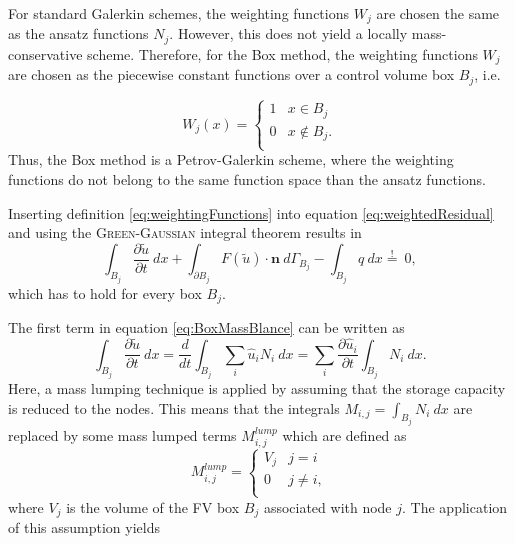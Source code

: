 For standard Galerkin schemes, the weighting functions $W_j$ are chosen the same as the ansatz functions $N_j$. However, this does not yield a locally mass-conservative scheme. 
Therefore, for the Box method, the weighting functions $W_j$ are chosen as 
the piecewise constant functions over a
control volume box $B_j$, i.e.

\begin{equation}
	W_j(x) = \begin{cases}
	          1 &x \in B_j \\
		  0 &x \notin B_j.\\
	         \end{cases}
\label{eq:weightingFunctions}	         
\end{equation}
Thus, the Box method is a Petrov-Galerkin scheme, where the weighting functions do not belong to the same function space than the ansatz functions.

Inserting definition \eqref{eq:weightingFunctions} into equation \eqref{eq:weightedResidual} and using the \textsc{Green-Gaussian} integral theorem results in
\begin{equation}
	\int_{B_j} \frac{\partial \tilde u}{\partial t} \: dx + \int_{\partial B_j}  F(\tilde u) \cdot \mathbf n \: d\varGamma_{B_j} - \int_{B_j} q \: dx  \overset {!}{=} \: 0, 	
\label{eq:BoxMassBlance}	
\end{equation}
which has to hold for every box $B_j$. 

The first term in equation \eqref{eq:BoxMassBlance} can be written as
\begin{equation}
\int_{B_j} \frac{\partial \tilde u}{\partial t} \: dx = \frac{d}{dt} \int_{B_j} \sum_i \hat u_i N_i  \: dx = \sum_i \frac{\partial \hat u_i}{\partial t} \int_{B_j}  N_i  \: dx.
\end{equation} 
Here, a mass lumping technique is applied by assuming that the storage capacity is
reduced to the nodes. This means that the integrals $M_{i,j} = \int_{B_j}  N_i \: dx$
are replaced by some mass lumped terms $M^{lump}_{i,j}$ which are defined as
\begin{equation}
	 M^{lump}_{i,j} =\begin{cases}  V_j &j = i\\
	0 &j \neq i,\\
	         \end{cases}
\end{equation}
where $V_j$ is the volume of the FV box $B_j$ associated with node $j$.
The application of this assumption yields


